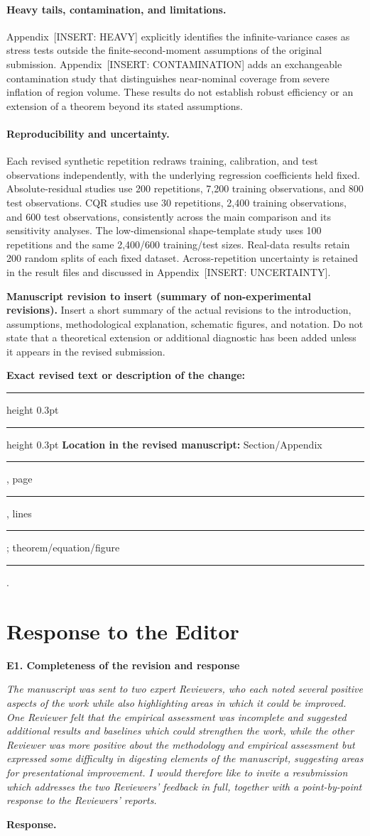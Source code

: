 \documentclass[11pt]{article}
\numberwithin{equation}{section}
\newcommand{\pending}[1]{\textcolor{AuthorRed}{[INSERT: #1]}}
\newcommand{\reviewercomment}[2]{%
  \par\medskip\noindent\textbf{#1}\par\nopagebreak
  \begingroup\color{ReviewerBlue}\itshape #2\par\endgroup
  \noindent\textbf{Response.} }
\newcommand{\revisionblock}[2]{%
  \par\begingroup\color{AuthorRed}\small
  \textbf{Manuscript revision to insert (#1).} #2\par
  \textbf{Exact revised text or description of the change:}\par
  \vspace{0.35em}\hrule height 0.3pt\vspace{1.4em}
  \hrule height 0.3pt\vspace{0.6em}
  \textbf{Location in the revised manuscript:}
  Section/Appendix \rule{1.3cm}{0.3pt},
  page \rule{1cm}{0.3pt},
  lines \rule{1.3cm}{0.3pt};
  theorem/equation/figure \rule{1.4cm}{0.3pt}.
  \par\endgroup}
\newcommand{\AppUncertainty}{Appendix~\pending{UNCERTAINTY}} %
\newcommand{\AppHeavy}{Appendix~\pending{HEAVY}} %
\newcommand{\AppContamination}{Appendix~\pending{CONTAMINATION}} %
\begin{document}
\paragraph{Heavy tails, contamination, and limitations.}
\AppHeavy{} explicitly identifies the infinite-variance cases as stress
tests outside the finite-second-moment assumptions of the original
submission. \AppContamination{} adds an exchangeable contamination study
that distinguishes near-nominal coverage from severe inflation of region
volume. These results do not establish robust efficiency or an extension
of a theorem beyond its stated assumptions.

\paragraph{Reproducibility and uncertainty.}
Each revised synthetic repetition redraws training, calibration, and test
observations independently, with the underlying regression coefficients
held fixed. Absolute-residual studies use 200 repetitions, 7,200 training
observations, and 800 test observations. CQR studies use 30 repetitions,
2,400 training observations, and 600 test observations, consistently across
the main comparison and its sensitivity analyses. The low-dimensional
shape-template study uses 100 repetitions and the same 2,400/600
training/test sizes. Real-data results retain 200 random splits of each
fixed dataset. Across-repetition uncertainty is retained in the result
files and discussed in \AppUncertainty{}.

\revisionblock{summary of non-experimental revisions}{Insert a short
summary of the actual revisions to the introduction, assumptions,
methodological explanation, schematic figures, and notation. Do not
state that a theoretical extension or additional diagnostic has been
added unless it appears in the revised submission.}

\section{Response to the Editor}
\label{sec:editor}

\reviewercomment{E1. Completeness of the revision and response}{%
The manuscript was sent to two expert Reviewers, who each noted several
positive aspects of the work while also highlighting areas in which it
could be improved. One Reviewer felt that the empirical assessment was
incomplete and suggested additional results and baselines which could
strengthen the work, while the other Reviewer was more positive about the
methodology and empirical assessment but expressed some difficulty in
digesting elements of the manuscript, suggesting areas for presentational
improvement. I would therefore like to invite a resubmission which
addresses the two Reviewers' feedback in full, together with a
point-by-point response to the Reviewers' reports.}
\end{document}
